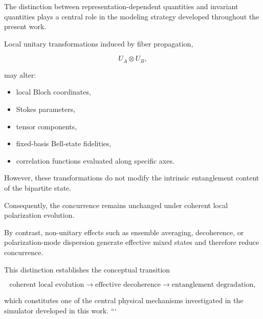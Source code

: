 The distinction between representation-dependent quantities and invariant quantities plays a central role in the modeling strategy developed throughout the present work.

\medskip

Local unitary transformations induced by fiber propagation,

\[
U_A \otimes U_B,
\]

may alter:

\begin{itemize}

\item local Bloch coordinates,

\item Stokes parameters,

\item tensor components,

\item fixed-basis Bell-state fidelities,

\item correlation functions evaluated along specific axes.

\end{itemize}

However, these transformations do not modify the intrinsic entanglement content of the bipartite state.

Consequently, the concurrence remains unchanged under coherent local polarization evolution.

\medskip

By contrast, non-unitary effects such as ensemble averaging, decoherence, or polarization-mode dispersion generate effective mixed states and therefore reduce concurrence.

This distinction establishes the conceptual transition

\[
\text{coherent local evolution}
\rightarrow
\text{effective decoherence}
\rightarrow
\text{entanglement degradation},
\]

which constitutes one of the central physical mechanisms investigated in the simulator developed in this work.
```
